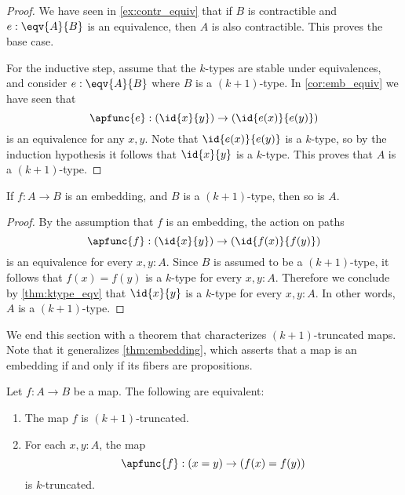 \begin{proof}
We have seen in \cref{ex:contr_equiv} that if $B$ is contractible and $e:\eqv{A}{B}$ is an equivalence, then $A$ is also contractible. This proves the base case.

For the inductive step, assume that the $k$-types are stable under equivalences, and consider $e:\eqv{A}{B}$ where $B$ is a $(k+1)$-type. In \cref{cor:emb_equiv} we have seen that
\begin{equation*}
\apfunc{e}:(\id{x}{y})\to(\id{e(x)}{e(y)})
\end{equation*}
is an equivalence for any $x,y$. Note that $\id{e(x)}{e(y)}$ is a $k$-type, so by the induction hypothesis it follows that $\id{x}{y}$ is a $k$-type. This proves that $A$ is a $(k+1)$-type.
\end{proof}

\begin{cor}\label{cor:emb_into_ktype}
If $f:A\to B$ is an embedding, and $B$ is a $(k+1)$-type, then so is $A$.
\end{cor}

\begin{proof}
By the assumption that $f$ is an embedding, the action on paths
\begin{equation*}
\apfunc{f}:(\id{x}{y})\to (\id{f(x)}{f(y)})
\end{equation*}
is an equivalence for every $x,y:A$. Since $B$ is assumed to be a $(k+1)$-type, it follows that $f(x)=f(y)$ is a $k$-type for every $x,y:A$. Therefore we conclude by \cref{thm:ktype_eqv} that $\id{x}{y}$ is a $k$-type for every $x,y:A$. In other words, $A$ is a $(k+1)$-type.
\end{proof}

We end this section with a theorem that characterizes $(k+1)$-truncated maps. Note that it generalizes \cref{thm:embedding}, which asserts that a map is an embedding if and only if its fibers are propositions.

\begin{thm}\label{thm:trunc_ap}
Let $f:A\to B$ be a map. The following are equivalent:
\begin{enumerate}
\item The map $f$ is $(k+1)$-truncated.
\item For each $x,y:A$, the map
\begin{equation*}
\apfunc{f} : (x=y)\to (f(x)=f(y))
\end{equation*}
is $k$-truncated. 
\end{enumerate}
\end{thm}

